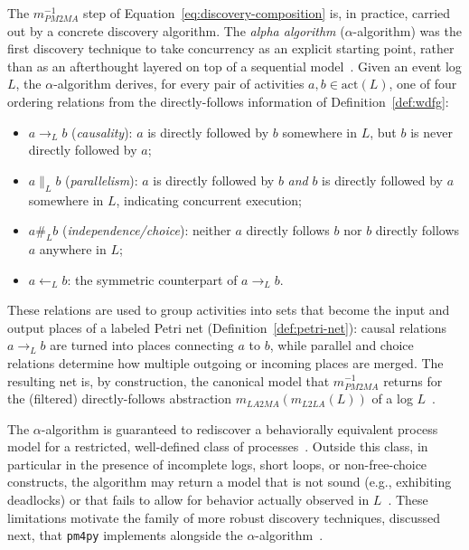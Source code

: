 The $m_{PM2MA}^{-1}$ step of Equation~\eqref{eq:discovery-composition} is,
in practice, carried out by a concrete discovery algorithm. The
\emph{alpha algorithm} ($\alpha$-algorithm) was the first discovery
technique to take concurrency as an explicit starting point, rather than as
an afterthought layered on top of a sequential
model~\cite{aalst2004workflow, aalst2018reconstruction}. Given an event log
$L$, the $\alpha$-algorithm derives, for every pair of activities
$a, b \in \mathrm{act}(L)$, one of four ordering relations from the
directly-follows information of Definition~\ref{def:wdfg}:

\begin{itemize}[leftmargin=*]
	\item $a \to_L b$ (\emph{causality}): $a$ is directly followed by $b$
	somewhere in $L$, but $b$ is never directly followed by $a$;
	\item $a \parallel_L b$ (\emph{parallelism}): $a$ is directly followed by
	$b$ \emph{and} $b$ is directly followed by $a$ somewhere in $L$, indicating
	concurrent execution;
	\item $a \#_L b$ (\emph{independence/choice}): neither $a$ directly
	follows $b$ nor $b$ directly follows $a$ anywhere in $L$;
	\item $a \leftarrow_L b$: the symmetric counterpart of $a \to_L b$.
\end{itemize}

These relations are used to group activities into sets that become the
input and output places of a labeled Petri net
(Definition~\ref{def:petri-net}): causal relations $a \to_L b$ are turned
into places connecting $a$ to $b$, while parallel and choice relations
determine how multiple outgoing or incoming places are merged. The
resulting net is, by construction, the canonical model that
$m_{PM2MA}^{-1}$ returns for the (filtered) directly-follows abstraction
$m_{LA2MA}(m_{L2LA}(L))$ of a log $L$~\cite{aalst2004workflow}.

The $\alpha$-algorithm is guaranteed to rediscover a behaviorally
equivalent process model for a restricted, well-defined class of
processes~\cite{aalst2004workflow}. Outside this class, in particular in
the presence of incomplete logs, short loops, or non-free-choice
constructs, the algorithm may return a model that is not
sound (e.g., exhibiting deadlocks) or that fails to allow for behavior
actually observed in $L$~\cite{aalst2018reconstruction}. These limitations
motivate the family of more robust discovery techniques, discussed next,
that \texttt{pm4py} implements alongside the
$\alpha$-algorithm~\cite{berti2019process}.

